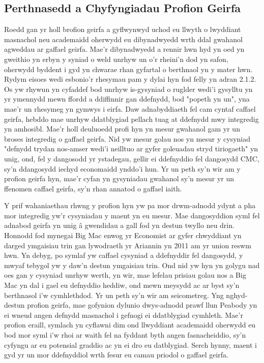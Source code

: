 \subsection{Perthnasedd a Chyfyngiadau Profion Geirfa}
Roedd gan yr holl brofion geirfa a gyflwynwyd uchod eu llwyth o lwyddiant masnachol neu academaidd oherwydd eu dibynadwyedd wrth ddal gwahanol agweddau ar gaffael geirfa. Mae'r dibynadwyedd a rennir hwn hyd yn oed yn gweithio yn erbyn y syniad o weld unrhyw un o'r rheini'n dod yn safon, oherwydd byddent i gyd yn chwarae rhan gyfartal o berthnaol yn y mater hwn. Rydym eisoes wedi esbonio'r rhesymau pam y dylai hyn fod felly yn adran 2.1.2. Os yw rhywun yn cyfaddef bod unrhyw is-gysyniad o ruglder wedi'i gysylltu yn yr ymennydd mewn ffordd a ddiffinnir gan ddefnydd, bod "popeth yn un", yna mae'r un rhesymeg yn gymwys i eirfa. Daw adnabyddiaeth fel cam cyntaf caffael geirfa, hebddo mae unrhyw ddatblygiad pellach tuag at ddefnydd mwy integredig yn amhosibl. Mae'r holl deuluoedd profi hyn yn mesur gwahanol gam yr un broses integredig o gaffael geirfa. Nid yw mesur golau nos yn mesur y cysyniad "defnydd trydan nos-amser wedi'i neilltuo ar gyfer goleuadau stryd tiriogaeth" yn unig, ond, fel y dangosodd yr ystadegau, gellir ei ddefnyddio fel dangosydd CMC, sy'n ddangosydd iechyd economaidd ynddo'i hun. Yr un peth sy'n wir am y profion geirfa hyn, mae'r cyfan yn gysyniadau gwahanol sy'n mesur yr un ffenomen caffael geirfa, sy'n rhan annatod o gaffael iaith.

Y prif wahaniaethau rhwng y profion hyn yw pa mor drwm-adnodd ydynt a pha mor integredig yw'r cysyniadau y maent yn eu mesur. Mae dangosyddion syml fel adnabod geirfa yn unig â gwendidau a gall fod yn destun twyllo neu drin. Honnodd fod mynegai Big Mac enwog yr Economist ar gyfer chwyddiant yn darged ymgaisiau trin gan lywodraeth yr Ariannin yn 2011 \parencite{politi_argentinas_2011} am yr union reswm hwn. Yn debyg, po symlaf yw caffael cysyniad a ddefnyddir fel dangosydd, y mwyaf tebygol yw y daw'n destun ymgaisiau trin. Ond nid yw hyn yn golygu nad oes gan y cysyniad unrhyw werth, yn wir, mae lefelau prisiau golau nos a Big Mac yn dal i gael eu defnyddio heddiw, ond mewn meysydd ac ar byst sy'n berthnasol i'w cymhlethdod. Yr un peth sy'n wir am seicometreg. Yng nghyd-destun profion geirfa, mae gofynion dylunio dwys-adnodd prawf llun Peabody yn ei wneud angen defnydd masnachol i gefnogi ei ddatblygiad cymhleth. Mae'r profion eraill, symlach yn cyflawni dim ond llwyddiant academaidd oherwydd eu bod mor syml i'w rhoi ar waith fel na fyddant byth angen fasnacheiddio, sy'n cyfyngu ar eu potensial graddio ac yn ei dro eu datblygiad. Serch hynny, maent i gyd yr un mor ddefnyddiol wrth fesur eu camau priodol o gaffael geirfa.

